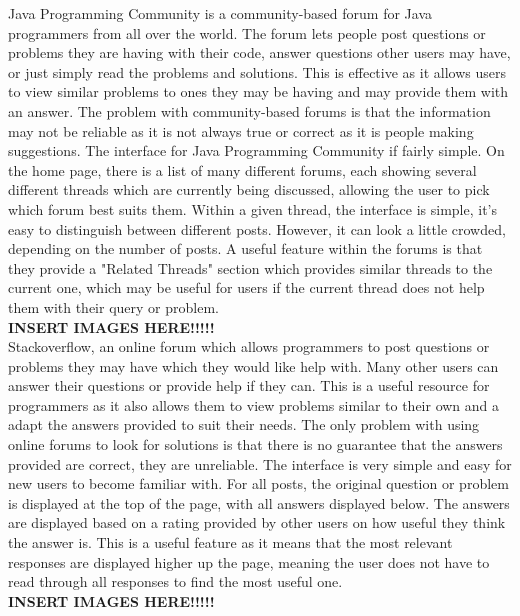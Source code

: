 \documentclass{article}
\begin{document}
Java Programming Community is a community-based forum for Java programmers from all over the world. The forum lets people post questions or problems they are having with their code, answer questions other users may have, or just simply read the problems and solutions. This is effective as it allows users to view similar problems to ones they may be having and may provide them with an answer. The problem with community-based forums is that the information may not be reliable as it is not always true or correct as it is people making suggestions. The interface for Java Programming Community if fairly simple. On the home page, there is a list of many different forums, each showing several different threads which are currently being discussed, allowing the user to pick which forum best suits them. Within a given thread, the interface is simple, it's easy to distinguish between different posts. However, it can look a little crowded, depending on the number of posts. A useful feature within the forums is that they provide a "Related Threads" section which provides similar threads to the current one, which may be useful for users if the current thread does not help them with their query or problem.\\

\textbf{INSERT IMAGES HERE!!!!!}\\

Stackoverflow, an online forum which allows programmers to post questions or problems they may have which they would like help with. Many other users can answer their questions or provide help if they can. This is a useful resource for programmers as it also allows them to view problems similar to their own and a adapt the answers provided to suit their needs. The only problem with using online forums to look for solutions is that there is no guarantee that the answers provided are correct, they are unreliable. The interface is very simple and easy for new users to become familiar with. For all posts, the original question or problem is displayed at the top of the page, with all answers displayed below. The answers are displayed based on a rating provided by other users on how useful they think the answer is. This is a useful feature as it means that the most relevant responses are displayed higher up the page, meaning the user does not have to read through all responses to find the most useful one. \\

\textbf{INSERT IMAGES HERE!!!!!}\\
\end{document}
